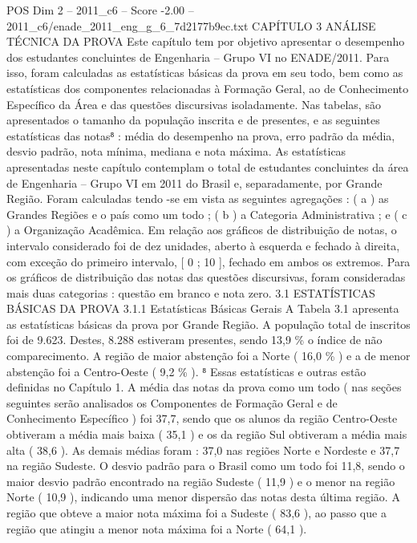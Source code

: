 \begin{textsample}{POS Dim 2 – 2011\_c6 – Score -2.00 – 2011\_c6/enade\_2011\_eng\_g\_6\_7d2177b9ec.txt}  \label{ex:f2_pos_408}
CAPÍTULO 3 ANÁLISE TÉCNICA DA PROVA Este capítulo tem por objetivo apresentar o desempenho dos estudantes concluintes de Engenharia – Grupo VI no ENADE/2011.
Para isso, foram calculadas as estatísticas básicas da prova em seu todo, bem como as estatísticas dos componentes relacionadas à Formação Geral, ao de Conhecimento Específico da Área e das questões discursivas isoladamente.
Nas tabelas, são apresentados o tamanho da população inscrita e de presentes, e as seguintes estatísticas das notas⁸ : média do desempenho na prova, erro padrão da média, desvio padrão, nota mínima, mediana e nota máxima.
As estatísticas apresentadas neste capítulo contemplam o total de estudantes concluintes da área de Engenharia – Grupo VI em 2011 do Brasil e, separadamente, por Grande Região.
Foram calculadas tendo -se em vista as seguintes agregações : ( a ) as Grandes Regiões e o país como um todo ; ( b ) a Categoria Administrativa ; e ( c ) a Organização Acadêmica.
Em relação aos gráficos de distribuição de notas, o intervalo considerado foi de dez unidades, aberto à esquerda e fechado à direita, com exceção do primeiro intervalo, [ 0 ; 10 ], fechado em ambos os extremos.
Para os gráficos de distribuição das notas das questões discursivas, foram consideradas mais duas categorias : questão em branco e nota zero. 3.1 ESTATÍSTICAS BÁSICAS DA PROVA 3.1.1 Estatísticas Básicas Gerais A Tabela 3.1 apresenta as estatísticas básicas da prova por Grande Região.
A população total de inscritos foi de 9.623.
Destes, 8.288 estiveram presentes, sendo 13,9 \% o índice de não comparecimento.
A região de maior abstenção foi a Norte ( 16,0 \% ) e a de menor abstenção foi a Centro-Oeste ( 9,2 \% ). ⁸ Essas estatísticas e outras estão definidas no Capítulo 1.
A média das notas da prova como um todo ( nas seções seguintes serão analisados os Componentes de Formação Geral e de Conhecimento Específico ) foi 37,7, sendo que os alunos da região Centro-Oeste obtiveram a média mais baixa ( 35,1 ) e os da região Sul obtiveram a média mais alta ( 38,6 ).
As demais médias foram : 37,0 nas regiões Norte e Nordeste e 37,7 na região Sudeste.
O desvio padrão para o Brasil como um todo foi 11,8, sendo o maior desvio padrão encontrado na região Sudeste ( 11,9 ) e o menor na região Norte ( 10,9 ), indicando uma menor dispersão das notas desta última região.
A região que obteve a maior nota máxima foi a Sudeste ( 83,6 ), ao passo que a região que atingiu a menor nota máxima foi a Norte ( 64,1 ).

\end{textsample}
